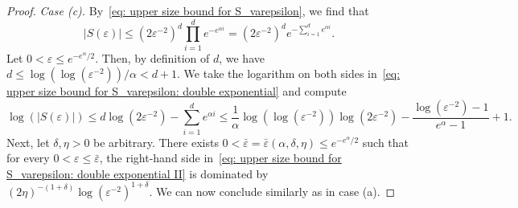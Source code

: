 \documentclass[10pt,a4paper]{amsart}
\newcommand{\abs}[1]{\left|#1\right|}
\begin{document}
\begin{proof}
    \emph{Case (c).} By~\eqref{eq: upper size bound for S_varepsilon}, we find that
    \begin{equation}
    \label{eq: upper size bound for S_varepsilon: double exponential}
        \abs{S(\varepsilon)} \leq (2 \varepsilon^{-2})^d \prod_{i=1}^d e^{-e^{\alpha i}}
        = (2 \varepsilon^{-2})^d  e^{-\sum_{i=1}^d  e^{\alpha i}}.
    \end{equation}
    Let \(0 < \varepsilon \leq e^{-e^{\alpha} / 2}\). Then, by definition of \(d\), we have \(d \leq \log(\log( \varepsilon^{-2})) / \alpha < d + 1\). We take the logarithm on both sides in~\eqref{eq: upper size bound for S_varepsilon: double exponential} and compute
    \begin{equation}
    \label{eq: upper size bound for S_varepsilon: double exponential II}
        \log(\abs{S(\varepsilon)}) 
        \leq d \log(2 \varepsilon^{-2}) - \sum_{i=1}^d e^{\alpha i} 
        \leq \frac{1}{\alpha} \log(\log(\varepsilon^{-2})) \log(2\varepsilon^{-2}) - \frac{\log(\varepsilon^{-2}) - 1}{e^{\alpha} - 1}  + 1.
    \end{equation}
    Next, let \(\delta,\eta > 0\) be arbitrary. There exists \(0 < \bar{\varepsilon} = \bar{\varepsilon}(\alpha, \delta, \eta) \leq e^{-e^{\alpha} / 2}\) such that for every \(0 < \varepsilon \leq \bar{\varepsilon}\), the right-hand side in~\eqref{eq: upper size bound for S_varepsilon: double exponential II} is dominated by \((2 \eta)^{-(1 + \delta)} \log(\varepsilon^{-2})^{1+\delta}\). We can now conclude similarly as in case (a).
\end{proof}
\end{document}
